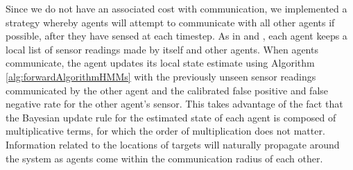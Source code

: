 Since we do not have an associated cost with communication, we implemented a strategy whereby agents will attempt to communicate with all other agents if possible, after they have sensed at each timestep. As in \cite{Chung2008Multi-agentFramework} and \cite{Waharte2009CoordinatedUAVs}, each agent keeps a local list of sensor readings made by itself and other agents. When agents communicate, the agent updates its local state estimate using Algorithm \ref{alg:forwardAlgorithmHMMs} with the previously unseen sensor readings communicated by the other agent and the calibrated false positive and false negative rate for the other agent's sensor. This takes advantage of the fact that the Bayesian update rule for the estimated state of each agent is composed of multiplicative terms, for which the order of multiplication does not matter. Information related to the locations of targets will naturally propagate around the system as agents come within the communication radius of each other. %